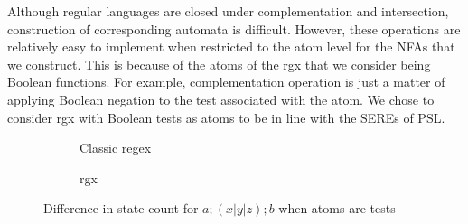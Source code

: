 Although regular languages are closed under complementation and
intersection, construction of corresponding automata is difficult.
However, these operations are relatively easy to implement when
restricted to the atom level for the \glspl{NFA} that we construct.
This is because of the atoms of the \gls{rgx} that we consider being
Boolean functions.
%
For example, complementation operation is just a matter of applying
Boolean negation to the test associated with the atom.
We chose to consider \gls{rgx} with Boolean tests as atoms to be in
line with the \glspl{SERE} of \gls{PSL}.

\begin{figure}
  \centering
  \begin{subfigure}{0.5\textwidth}
      \centering
      
      \caption{Classic regex}
      \label{fig:state-count-re}
  \end{subfigure}
  \par\bigskip
  \begin{subfigure}{0.5\textwidth}
      \centering
      
      \caption{\Gls{rgx}}
      \label{fig:state-count-taa}
  \end{subfigure}
  \caption{Difference in state count for $a;(x|y|z);b$ when atoms are tests}
  \label{fig:state-count}
\end{figure}

